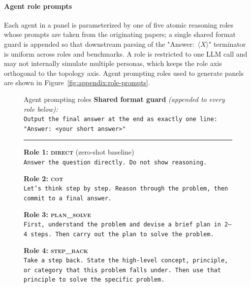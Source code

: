 \paragraph{Agent role prompts}
Each agent in a panel is parameterized by one of five atomic reasoning
roles whose prompts are taken from
the originating papers; a single shared format guard is appended so
that downstream parsing of the "Answer:~$\langle X\rangle$" terminator
is uniform across roles and benchmarks. A role is restricted to one
LLM call and may not internally simulate multiple personas, which
keeps the role axis orthogonal to the topology axis. Agent prompting roles used to generate panels are shown in Figure~\ref{fig:appendix:role-prompts}.
\begin{figure}[h]
\centering
\small

\begin{promptbox}{Agent prompting roles}
\textbf{Shared format guard} \textit{(appended to every role below):}\\[2pt]
\texttt{Output the final answer at the end as exactly one line:
"Answer: <your short answer>"}

\vspace{6pt}\hrule\vspace{4pt}

\textbf{Role 1: \textsc{direct}} (zero-shot baseline)\\[2pt]
\texttt{Answer the question directly. Do not show reasoning.}

\vspace{6pt}

\textbf{Role 2: \textsc{cot}}~\citep{wei2023chainofthoughtpromptingelicitsreasoning}\\[2pt]
\texttt{Let's think step by step. Reason through the problem,
then commit to a final answer.}

\vspace{6pt}

\textbf{Role 3: \textsc{plan\_solve}}~\citep{wang2023planandsolvepromptingimprovingzeroshot}\\[2pt]
\texttt{First, understand the problem and devise a brief plan in
2--4 steps. Then carry out the plan to solve the problem.}

\vspace{6pt}

\textbf{Role 4: \textsc{step\_back}}~\citep{zheng2024stepbackevokingreasoning}\\[2pt]
\texttt{Take a step back. State the high-level concept, principle,
or category that this problem falls under. Then use that principle
to solve the specific problem.}


\end{promptbox}
\end{figure}
